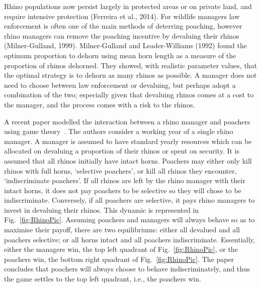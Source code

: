 \documentclass[10pt]{article}
\begin{document}
Rhino populations now persist largely in protected areas or on private land, and
require intensive protection (Ferreira et al., 2014). For wildlife managers law 
enforcement is often one of the main methods of deterring poaching, however 
rhino managers can remove the poaching incentive by devaluing their rhinos 
(Milner-Gulland, 1999). Milner-Gulland and Leader-Williams (1992) found the 
optimum proportion to dehorn using mean horn length as a measure of the 
proportion of rhinos dehorned. They showed, with realistic parameter values, 
that the optimal strategy is to dehorn as many rhinos as possible. 
A manager does not need to choose between law enforcement or devaluing, but
perhaps adopt a combination of the two; especially given that devaluing rhinos 
comes at a cost to the manager, and the process comes with a risk to the rhinos.

A recent paper modelled the interaction between a rhino manager and poachers
using game theory~\cite{Lee}.  The authors consider a working year of a single 
rhino manager.  A manager is assumed to have standard yearly resources which
can be allocated on devaluing a proportion of their rhinos or spent on security. 
It is assumed that all rhinos initially have intact horns. Poachers may either only
kill rhinos with full horns, `selective poachers', or kill all rhinos they encounter, 
`indiscriminate poachers'. If all rhinos are left by the rhino manager with their 
intact horns, it does not pay poachers to be selective so they will chose to be 
indiscriminate. Conversely, if all poachers are selective, it pays rhino managers 
to invest in devaluing their rhinos. This dynamic is represented in Fig.~\ref{fig:RhinoPic}.
Assuming poachers and managers will always behave so as to maximise their 
payoff, there are two equilibriums: either all devalued and all poachers selective;
or all horns intact and all poachers indiscriminate. Essentially, either the managers 
win, the top left quadrant of Fig.~\ref{fig:RhinoPic}, or the poachers win, the bottom
right quadrant of Fig.~\ref{fig:RhinoPic}. The paper concludes that poachers will
always choose to behave indiscriminately, and thus the game settles to the top
left quadrant, i.e., the poachers win.
\end{document}
